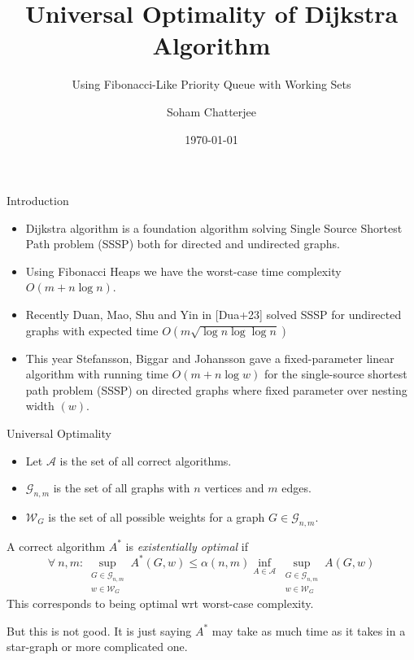 \documentclass[10pt]{beamer}
\title{Universal Optimality of Dijkstra Algorithm}
\subtitle{Using Fibonacci-Like Priority Queue with Working Sets}
\date{\today}
\author{Soham Chatterjee}
\institute{Oral Qualifier, STCS}
\begin{document}
\maketitle


\begin{frame}{Introduction}
    \begin{itemize}
        \item Dijkstra algorithm is a foundation algorithm solving Single Source Shortest Path problem (SSSP) both for directed and undirected graphs.
        \item Using Fibonacci Heaps we have the worst-case time complexity $O(m+n\log n)$. \pause
        \item Recently Duan, Mao, Shu and Yin in [Dua+23] solved SSSP for undirected graphs with expected time $O(m\sqrt{\log n\log\log n})$\pause
        \item This year Stefansson, Biggar and  Johansson gave a fixed-parameter linear algorithm with running time $O(m+n\log w)$ for the single-source shortest path problem (SSSP) on directed graphs where fixed parameter over nesting width $(w)$.
    \end{itemize}
\end{frame}
\begin{frame}{Universal Optimality}
	\begin{itemize}
		\item Let $\mathcal{A}$ is the set of all correct algorithms.
		\item $\mathcal{G}_{n,m}$ is the set of all graphs with $n$ vertices and $m$ edges.
		\item $\mathcal{W}_G$ is the set of all possible weights for a graph $G\in\mathcal{G}_{n,m}$.
	\end{itemize} \pause\vfill
	A correct algorithm $A^*$ is \emph{existentially optimal} if $$\forall\ n,m: \sup\limits_{\substack{G\in\mathcal{G}_{n,m}\\ w\in \mathcal{W}_G} }A^*(G,w)\leq \alpha(n,m)\inf\limits_{A\in \mathcal{A}}\sup\limits_{\substack{G\in\mathcal{G}_{n,m}\\ w\in \mathcal{W}_G} } A(G,w)$$This corresponds to being optimal wrt worst-case complexity.\pause  \setlength{\parindent}{1cm}\vfill

	But this is not good. It is just saying $A^*$ may take as much time as it takes in a star-graph or more complicated one.
\end{frame}
\end{document}
